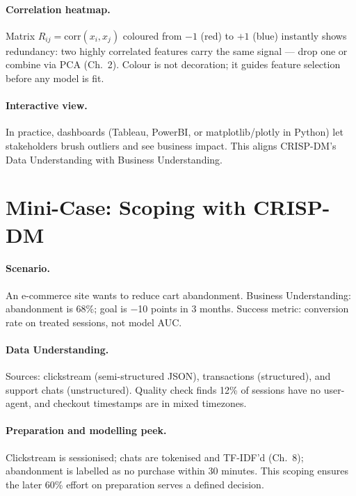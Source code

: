 \paragraph{Correlation heatmap.} Matrix $R_{ij}=\text{corr}(x_i,x_j)$ coloured from $-1$ (red) to $+1$ (blue) instantly shows redundancy: two highly correlated features carry the same signal --- drop one or combine via PCA (Ch.~2). Colour is not decoration; it guides feature selection before any model is fit.

\paragraph{Interactive view.} In practice, dashboards (Tableau, PowerBI, or matplotlib/plotly in Python) let stakeholders brush outliers and see business impact. This aligns CRISP-DM's Data Understanding with Business Understanding.

\section{Mini-Case: Scoping with CRISP-DM}
\label{sec:minicase-ch1}
\paragraph{Scenario.} An e-commerce site wants to reduce cart abandonment. Business Understanding: abandonment is 68\%; goal is $-$10 points in 3 months. Success metric: conversion rate on treated sessions, not model AUC.

\paragraph{Data Understanding.} Sources: clickstream (semi-structured JSON), transactions (structured), and support chats (unstructured). Quality check finds 12\% of sessions have no user-agent, and checkout timestamps are in mixed timezones.

\paragraph{Preparation and modelling peek.} Clickstream is sessionised; chats are tokenised and TF-IDF'd (Ch.~8); abandonment is labelled as no purchase within 30 minutes. This scoping ensures the later 60\% effort on preparation serves a defined decision.

